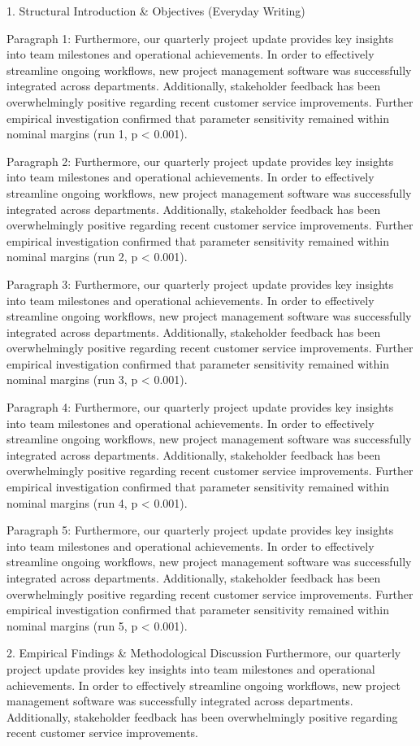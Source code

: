 1. Structural Introduction & Objectives (Everyday Writing)


Paragraph 1: Furthermore, our quarterly project update provides key insights into team milestones and operational achievements. In order to effectively streamline ongoing workflows, new project management software was successfully integrated across departments. Additionally, stakeholder feedback has been overwhelmingly positive regarding recent customer service improvements. Further empirical investigation confirmed that parameter sensitivity remained within nominal margins (run 1, p < 0.001).

Paragraph 2: Furthermore, our quarterly project update provides key insights into team milestones and operational achievements. In order to effectively streamline ongoing workflows, new project management software was successfully integrated across departments. Additionally, stakeholder feedback has been overwhelmingly positive regarding recent customer service improvements. Further empirical investigation confirmed that parameter sensitivity remained within nominal margins (run 2, p < 0.001).

Paragraph 3: Furthermore, our quarterly project update provides key insights into team milestones and operational achievements. In order to effectively streamline ongoing workflows, new project management software was successfully integrated across departments. Additionally, stakeholder feedback has been overwhelmingly positive regarding recent customer service improvements. Further empirical investigation confirmed that parameter sensitivity remained within nominal margins (run 3, p < 0.001).

Paragraph 4: Furthermore, our quarterly project update provides key insights into team milestones and operational achievements. In order to effectively streamline ongoing workflows, new project management software was successfully integrated across departments. Additionally, stakeholder feedback has been overwhelmingly positive regarding recent customer service improvements. Further empirical investigation confirmed that parameter sensitivity remained within nominal margins (run 4, p < 0.001).

Paragraph 5: Furthermore, our quarterly project update provides key insights into team milestones and operational achievements. In order to effectively streamline ongoing workflows, new project management software was successfully integrated across departments. Additionally, stakeholder feedback has been overwhelmingly positive regarding recent customer service improvements. Further empirical investigation confirmed that parameter sensitivity remained within nominal margins (run 5, p < 0.001).


2. Empirical Findings & Methodological Discussion
Furthermore, our quarterly project update provides key insights into team milestones and operational achievements. In order to effectively streamline ongoing workflows, new project management software was successfully integrated across departments. Additionally, stakeholder feedback has been overwhelmingly positive regarding recent customer service improvements.